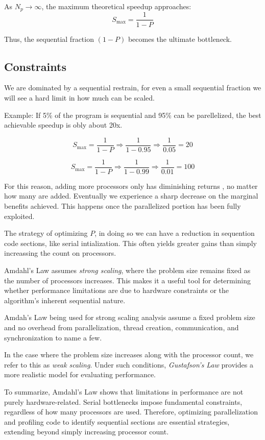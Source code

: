 \documentclass[12pt]{article}
\begin{document}
As \( N_p \to \infty \), the maximum theoretical speedup approaches:
\[
S_{\text{max}} = \frac{1}{1 - P}
\]

Thus, the sequential fraction \( (1 - P) \) becomes the ultimate bottleneck.

\subsection*{Constraints
}
We are dominated by a sequential restrain, for even a small sequential fraction we will see a hard limit in how much can be scaled. 

Example: If 5\% of the program is sequential and 95\% can be parellelized, the best achievable speedup is obly about 20x.

\[
S_{\text{max}} = \frac{1}{1 - P} \Rightarrow \frac{1}{1 - 0.95} \Rightarrow \frac{1}{0.05} = 20
\]


\[
S_{\text{max}} = \frac{1}{1 - P} \Rightarrow \frac{1}{1 - 0.99} \Rightarrow \frac{1}{0.01} = 100
\]

For this reason, adding more processors only has diminishing returns , no matter how many are added. Eventually we experience a sharp decrease on the marginal benefits achieved. This happens once the parallelized portion has been fully exploited. 

The strategy of optimizing \( P \), in doing so we can have a reduction in sequention code sections, like serial intialization. This often yields greater gains than simply increassing the count on processors. 

Amdahl’s Law assumes \emph{strong scaling}, where the problem size remains fixed as the number of processors increases. This makes it a useful tool for determining whether performance limitations are due to hardware constraints or the algorithm’s inherent sequential nature.

Amdah's Law being used for strong scaling analysis assume a fixed problem size and no overhead from parallelization, thread creation, communication, and synchronization to name a few. 

In the case where the problem size increases along with the processor count, we refer to this as \emph{weak scaling}. Under such conditions, \emph{Gustafson's Law} provides a more realistic model for evaluating performance.

To summarize, Amdahl's Law shows that limitations in performance are not purely hardware-related. Serial bottlenecks impose fundamental constraints, regardless of how many processors are used. Therefore, optimizing parallelization and profiling code to identify sequential sections are essential strategies, extending beyond simply increasing processor count.
\end{document}
